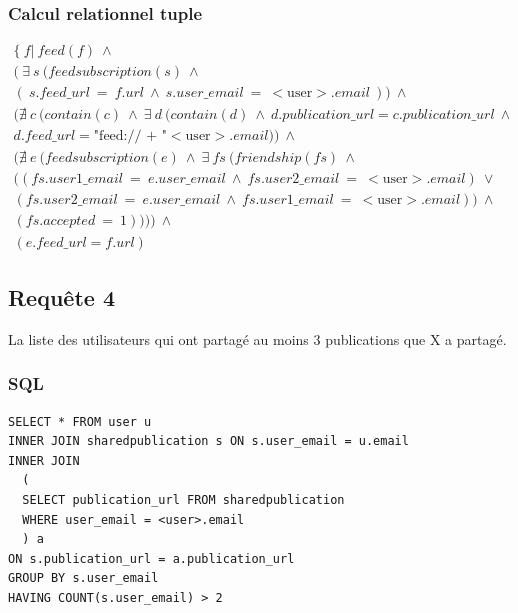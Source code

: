 \documentclass[a4paper,10pt]{article}
\begin{document}
\subsubsection{Calcul relationnel tuple}

\begin{equation*}
 \begin{split}
  \{\ f |\ feed(f)\ \wedge\\
  (\ \exists\ s\ (feedsubscription(s)\ \wedge\\
  (\ s.feed\_url\ =\ f.url\ \wedge\ s.user\_email\ =\ <\text{user}>.email\ ))\   \wedge\\
  (\nexists\ c\ (contain(c)\ \wedge\ \exists\ d\ (contain(d)\ \wedge\ d.publication\_url = c.publication\_url\ \wedge\\
  d.feed\_url = \text{"feed:// + "}<\text{user}>.email) )\ \wedge\\
  (\nexists\ e\ (feedsubscription(e)\ \wedge\ \exists\ fs\ (friendship(fs)\ \wedge\\
  ((fs.user1\_email\ =\ e.user\_email\ \wedge\ fs.user2\_email\ =\ <\text{user}>.email)\ \vee\\
  (fs.user2\_email\ =\ e.user\_email\ \wedge\ fs.user1\_email\ =\ <\text{user}>.email))\ \wedge\\
  (fs.accepted\ =\ 1))))\ \wedge\\
  (e.feed\_url = f.url)
  \end{split}
\end{equation*}
\clearpage
\subsection{Requête 4}
La liste des utilisateurs qui ont partagé au moins 3 publications que X a partagé.
\subsubsection{SQL}
\begin{lstlisting}
SELECT * FROM user u
INNER JOIN sharedpublication s ON s.user_email = u.email
INNER JOIN 
  (
  SELECT publication_url FROM sharedpublication 
  WHERE user_email = <user>.email
  ) a
ON s.publication_url = a.publication_url
GROUP BY s.user_email
HAVING COUNT(s.user_email) > 2
\end{lstlisting}
\end{document}
